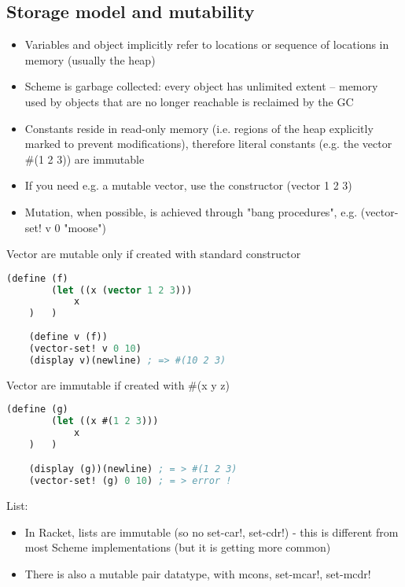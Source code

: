 \subsection{Storage model and mutability}
\begin{itemize}
    \item Variables and object implicitly refer to locations or sequence of locations in memory (usually the heap)
    \item Scheme is garbage collected: every object has unlimited extent – memory used by objects that are no longer reachable is reclaimed by the GC
    \item Constants reside in read-only memory (i.e. regions of the heap explicitly marked to prevent modifications), therefore literal constants (e.g. the vector \#(1 2 3)) are immutable
    \item If you need e.g. a mutable vector, use the constructor (vector 1 2 3)
    \item Mutation, when possible, is achieved through "bang procedures", e.g. (vector-set! v 0 "moose")
\end{itemize}
Vector are mutable only if created with standard constructor
\begin{lstlisting}[language=Lisp]
    (define (f)
        (let ((x (vector 1 2 3)))
            x
    )   )
    
    (define v (f))
    (vector-set! v 0 10)
    (display v)(newline) ; => #(10 2 3)
\end{lstlisting}
Vector are immutable if created with \#(x y z)
\begin{lstlisting}[language=Lisp]
    (define (g)
        (let ((x #(1 2 3)))
            x
    )   )

    (display (g))(newline) ; = > #(1 2 3)
    (vector-set! (g) 0 10) ; = > error !
\end{lstlisting}
List:
\begin{itemize}
    \item In Racket, lists are immutable (so no set-car!, set-cdr!) - this is different from most Scheme implementations (but it is getting more common)
    \item There is also a mutable pair datatype, with mcons, set-mcar!, set-mcdr!
\end{itemize}

